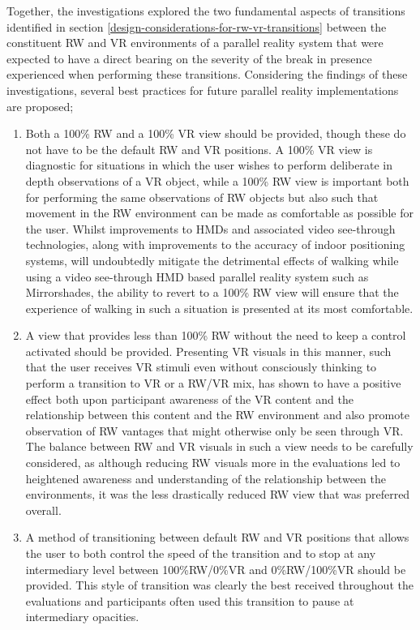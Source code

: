 Together, the investigations explored the two fundamental aspects of transitions identified in section \ref{design-considerations-for-rw-vr-transitions} between the constituent RW and VR environments of a parallel reality system that were expected to have a direct bearing on the severity of the break in presence experienced when performing these transitions. Considering the findings of these investigations, several best practices for future parallel reality implementations are proposed;

\begin{enumerate}
	\item Both a 100\% RW and a 100\% VR view should be provided, though these do not have to be the default RW and VR positions. A 100\% VR view is diagnostic for situations in which the user wishes to perform deliberate in depth observations of a VR object, while a 100\% RW view is important both for performing the same observations of RW objects but also such that movement in the RW environment can be made as comfortable as possible for the user. Whilst improvements to HMDs and associated video see-through technologies, along with improvements to the accuracy of indoor positioning systems, will undoubtedly mitigate the detrimental effects of walking while using a video see-through HMD based parallel reality system such as Mirrorshades, the ability to revert to a 100\% RW view will ensure that the experience of walking in such a situation is presented at its most comfortable.
	\item A view that provides less than 100\% RW without the need to keep a control activated should be provided. Presenting VR visuals in this manner, such that the user receives VR stimuli even without consciously thinking to perform a transition to VR or a RW/VR mix, has shown to have a positive effect both upon participant awareness of the VR content and the relationship between this content and the RW environment and also promote observation of RW vantages that might otherwise only be seen through VR. The balance between RW and VR visuals in such a view needs to be carefully considered, as although reducing RW visuals more in the evaluations led to heightened awareness and understanding of the relationship between the environments, it was the less drastically reduced RW view that was preferred overall.
	\item A method of transitioning between default RW and VR positions that allows the user to both control the speed of the transition and to stop at any intermediary level between 100\%RW/0\%VR and 0\%RW/100\%VR should be provided. This style of transition was clearly the best received throughout the evaluations and participants often used this transition to pause at intermediary opacities.
\end{enumerate}

